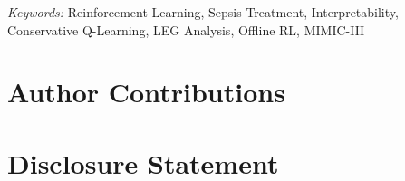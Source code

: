 \documentclass[11pt]{article}
\begin{document}
\noindent%
{\it Keywords:} Reinforcement Learning, Sepsis Treatment, Interpretability, Conservative Q-Learning, LEG Analysis, Offline RL, MIMIC-III

\vfill
\newpage
{} %






















\section{Author Contributions}



\section{Disclosure Statement}
\end{document}

